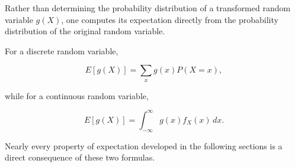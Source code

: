 \documentclass[11pt]{article}
\begin{document}
\begin{mdframed}[
		linewidth=0.8pt,
		roundcorner=6pt,
		backgroundcolor=gray!5,
		linecolor=gray!60,
		innertopmargin=10pt,
		innerbottommargin=10pt,
		innerleftmargin=10pt,
		innerrightmargin=10pt
		]
		Rather than determining the probability distribution of a transformed
		random variable $g(X)$, one computes its expectation directly from the
		probability distribution of the original random variable.
		
		For a discrete random variable,
		
		\[
		\boxed{
			E[g(X)]
			=
			\sum_xg(x)P(X=x),
		}
		\]
		
		while for a continuous random variable,
		
		\[
		\boxed{
			E[g(X)]
			=
			\int_{-\infty}^{\infty}
			g(x)f_X(x)\,dx.
		}
		\]
		
		Nearly every property of expectation developed in the following sections is
		a direct consequence of these two formulas.
		
	\end{mdframed}
	
\end{document}
